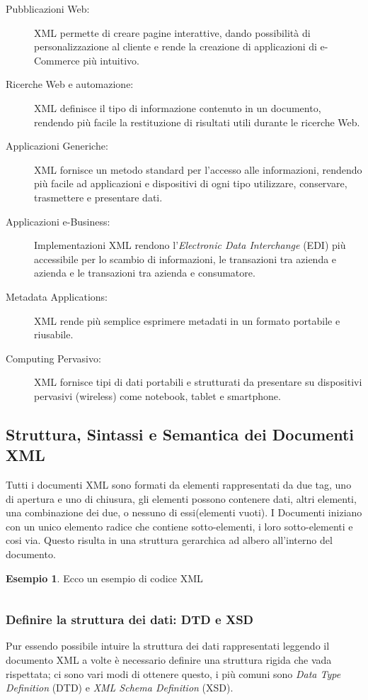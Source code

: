 \documentclass[12pt,a4paper,openright,twoside]{report}
\theoremstyle{definition}
\newtheorem{example}{Esempio}[]
\begin{document}
\begin{description}
\item[Pubblicazioni Web:] XML permette di creare pagine interattive, dando possibilità di personalizzazione al cliente e rende la creazione di applicazioni di e-Commerce più intuitivo.
\item[Ricerche Web e automazione:] XML definisce il tipo di  informazione contenuto in un documento, rendendo più facile la restituzione di risultati utili durante le ricerche Web.
\item[Applicazioni Generiche:] XML fornisce un metodo standard per l'accesso alle informazioni, rendendo più facile ad applicazioni e dispositivi di ogni tipo  utilizzare, conservare, trasmettere e presentare dati.
\item[Applicazioni e-Business:] Implementazioni XML rendono l'\emph{Electronic Data Interchange} (EDI) più accessibile per lo scambio di informazioni, le transazioni tra azienda e azienda e le transazioni tra azienda e consumatore.
\item[Metadata Applications:] XML rende più semplice esprimere metadati in un formato portabile e riusabile.
\item[Computing Pervasivo:] XML fornisce tipi di dati portabili e strutturati da presentare su dispositivi pervasivi (wireless) come notebook, tablet e smartphone.
\end{description}

\subsection{Struttura, Sintassi e Semantica dei Documenti XML}

Tutti i documenti XML sono formati da elementi rappresentati da due tag, uno di apertura e uno di chiusura, gli elementi possono contenere dati, altri elementi, una combinazione dei due, o nessuno di essi(elementi vuoti). I Documenti iniziano con un unico elemento radice che contiene sotto-elementi, i loro sotto-elementi e cosi via. Questo risulta in una struttura gerarchica ad albero all'interno del documento.
\newpage
\begin{example}
Ecco un esempio di codice XML\\
\inputminted[linenos,frame=lines]{xml}{esempio1.xml}
\label{lst:xml_example}
\end{example}

\subsubsection{Definire la struttura dei dati: DTD e XSD}
Pur essendo possibile intuire la struttura dei dati rappresentati leggendo il documento XML a volte è necessario definire una struttura rigida che vada rispettata; ci sono vari modi di ottenere questo, i più comuni sono \emph{Data Type Definition} (DTD) e \emph{XML Schema Definition} (XSD).
\end{document}
